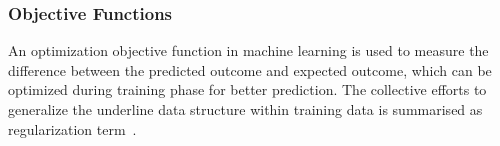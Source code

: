\subsubsection{Objective Functions}
An optimization objective function in machine learning is used to measure the difference between the predicted outcome and expected outcome, which can be optimized during training phase for better prediction. The collective efforts to generalize the underline data structure within training data is summarised as regularization term~\cite{goodfellow_2015}.  